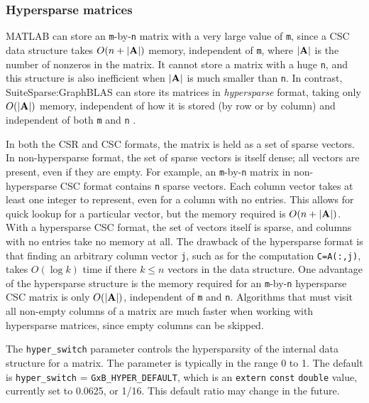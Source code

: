 \subsubsection{Hypersparse matrices}
\label{hypersparse}

MATLAB can store an \verb'm'-by-\verb'n' matrix with a very large value of
\verb'm', since a CSC data structure takes $O(n+|{\bf A}|)$ memory, independent
of \verb'm', where $|{\bf A}|$ is the number of nonzeros in the matrix.  It
cannot store a matrix with a huge \verb'n', and this structure is also
inefficient when $|{\bf A}|$ is much smaller than \verb'n'.  In contrast,
SuiteSparse:GraphBLAS can store its matrices in {\em hypersparse} format,
taking only $O(|{\bf A}|)$ memory, independent of how it is stored (by row or
by column) and independent of both \verb'm' and \verb'n'
\cite{BulucGilbert08,BulucGilbert12}.

In both the CSR and CSC formats, the matrix is held as a set of sparse vectors.
In non-hypersparse format, the set of sparse vectors is itself dense; all
vectors are present, even if they are empty.  For example, an
\verb'm'-by-\verb'n' matrix in non-hypersparse CSC format contains \verb'n'
sparse vectors.  Each column vector takes at least one integer to represent,
even for a column with no entries.  This allows for quick lookup for a
particular vector, but the memory required is $O(n+|{\bf A}|)$.  With a
hypersparse CSC format, the set of vectors itself is sparse, and columns with
no entries take no memory at all.  The drawback of the hypersparse format is
that finding an arbitrary column vector \verb'j', such as for the computation
\verb'C=A(:,j)', takes $O(\log k)$ time if there $k \le n$ vectors in the data
structure.  One advantage of the hypersparse structure is the memory required
for an \verb'm'-by-\verb'n' hypersparse CSC matrix is only $O(|{\bf A}|)$,
independent of \verb'm' and \verb'n'.  Algorithms that must visit all non-empty
columns of a matrix are much faster when working with hypersparse matrices,
since empty columns can be skipped.

The \verb'hyper_switch' parameter controls the hypersparsity of the internal
data structure for a matrix.  The parameter is typically in the range 0 to 1.
The default is \verb'hyper_switch' = \verb'GxB_HYPER_DEFAULT', which is an
\verb'extern' \verb'const' \verb'double' value, currently set to 0.0625, or
1/16.  This default ratio may change in the future.

